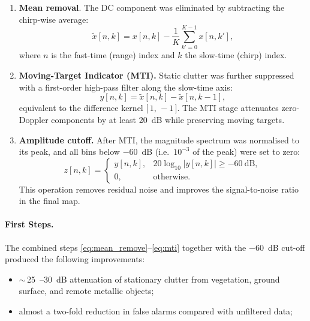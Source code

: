 \begin{enumerate}
    \item \textbf{Mean removal}.  
    The DC component was eliminated by subtracting the chirp-wise average:
    \begin{equation}
        \tilde{x}[n,k] = x[n,k] -
        \frac{1}{K}\sum_{k'=0}^{K-1} x[n,k'],
        \label{eq:mean_remove}
    \end{equation}
    where $n$ is the fast-time (range) index and $k$ the slow-time (chirp) index.

    \item \textbf{Moving-Target Indicator (MTI).}  
    Static clutter was further suppressed with a first-order high-pass filter along the slow-time axis:
    \begin{equation}
        y[n,k] = \tilde{x}[n,k] - \tilde{x}[n,k-1],
        \label{eq:mti}
    \end{equation}
    equivalent to the difference kernel $\bigl[\,1,\,-1\,\bigr]$.  
    The MTI stage attenuates zero-Doppler components by at least \SI{20}{dB} while preserving moving targets.

    

    \item \textbf{Amplitude cutoff.}  
    After MTI, the magnitude spectrum was normalised to its peak, and all bins below \SI{-60}{dB} (i.e.\ \(10^{-3}\) of the peak) were set to zero:
    $$
        z[n,k] =
        \begin{cases}
            y[n,k], & 20\log_{10}\!\bigl|y[n,k]\bigr| \ge -60\ \mathrm{dB},\\[4pt]
            0,      & \text{otherwise.}
        \end{cases}
    $$
    This operation removes residual noise and improves the signal-to-noise ratio in the final map.
\end{enumerate}

\paragraph{First Steps.}
The combined steps \eqref{eq:mean_remove}–\eqref{eq:mti} together with the \SI{-60}{dB} cut-off produced the following improvements:

\begin{itemize}
    \item $\sim$\,\SI{25}{–}\SI{30}{dB} attenuation of stationary clutter from vegetation, ground surface, and remote metallic objects;
    \item almost a two-fold reduction in false alarms compared with unfiltered data;

\end{itemize}


